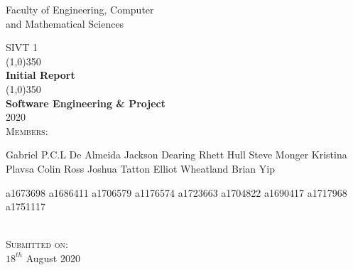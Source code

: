 
\begin{titlepage}
    \begin{center}
        \vspace*{100pt}
        \large{Faculty of Engineering, Computer\\ and Mathematical Sciences}\\
        \vspace*{15pt}
  
        {\large SIVT 1}\\
        [-5pt]
        \line(1,0){350}\\
        [15pt]
        {\huge \bfseries Initial Report }\\
        [1pt]
        \line(1,0){350}\\
        [5pt]
        {\large \bfseries Software Engineering \& Project}
        \\
        [10pt]
        {\Large 2020}\\
        \vspace*{45pt}
        \textsc{\normalsize Members:}\\
        [10pt]
    \centering
    \begin{minipage}{ .45\textwidth}
        \centering
        {\normalsize 
        \flushleft Gabriel P.C.L De Almeida
         \flushleft Jackson Dearing 
         \flushleft Rhett Hull
        \flushleft Steve Monger 
       \flushleft Kristina Plavsa
       \flushleft Colin Ross
       \flushleft Joshua Tatton
       \flushleft Elliot Wheatland
       \flushleft Brian Yip\\}
    \end{minipage}%
    \begin{minipage}{0.45\textwidth}
        \centering
        {\normalsize 
        \flushright a1673698
        \flushright a1686411
        \flushright a1706579
        \flushright a1176574
        \flushright a1723663
        \flushright a1704822
        \flushright a1690417
        \flushright a1717968
        \flushright a1751117\\}
    
    \end{minipage}\\
    
    \vspace*{20pt}
        \textsc{\normalsize Submitted on:}\\
        [5pt]
        {$18^{th}$ August 2020}\\
    \end{center}
\end{titlepage}
\cleardoublepage
{}
